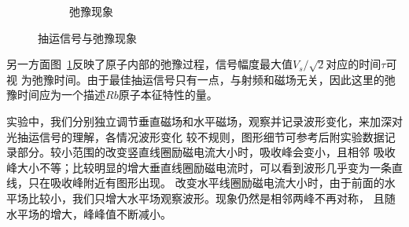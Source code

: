 \documentclass[11pt,a4paper]{article}
\begin{document}
\begin{spacing}{1.3}
\begin{CJK*}{UTF8}{gbsn}
\begin{figure}[h!]
\begin{subfigure}{0.50\textwidth}
\caption{弛豫现象}
\label{fig:fangb}
\end{subfigure}
\caption{抽运信号与弛豫现象}\label{fig:fang}
\end{figure}
另一方面图~\ref{fig:fangb}反映了原子内部的弛豫过程，信号幅度最大值$V_s/\sqrt{2}$对应的时间$\tau$可视
为弛豫时间。由于最佳抽运信号只有一点，与射频和磁场无关，因此这里的弛豫时间应为一个描述$Rb$原子本征特性的量。\par 
实验中，我们分别独立调节垂直磁场和水平磁场，观察并记录波形变化，来加深对光抽运信号的理解，各情况波形变化
较不规则，图形细节可参考后附实验数据记录部分。较小范围的改变竖直线圈励磁电流大小时，吸收峰会变小，且相邻
吸收峰大小不等；比较明显的增大垂直线圈励磁电流时，可以看到波形几乎变为一条直线，只在吸收峰附近有图形出现。
改变水平线圈励磁电流大小时，由于前面的水平场比较小，我们只增大水平场观察波形。现象仍然是相邻两峰不再对称，
且随水平场的增大，峰峰值不断减小。
\par 

\end{CJK*}
\end{spacing}
\end{document}
